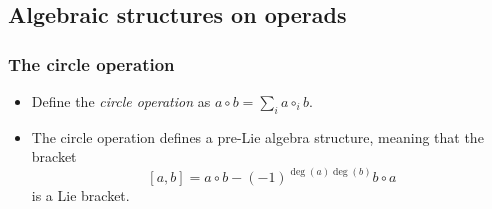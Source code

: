 \documentclass{beamer}
\theoremstyle{definition}
\newtheorem{defi}{Definition}
\begin{document}

\subsection{Algebraic structures on operads}
\begin{frame}
\frametitle{The circle operation}
\begin{itemize}
\item<1-> Define the \emph{circle operation} as $a\circ b = \sum_i a\circ_i b$. %
\item The circle operation defines a pre-Lie algebra structure, meaning that the bracket
\[[a,b]=a\circ b-(-1)^{\deg(a)\deg(b)}b\circ a\]
is a Lie bracket.
\end{itemize}
\end{frame}
\end{document}
